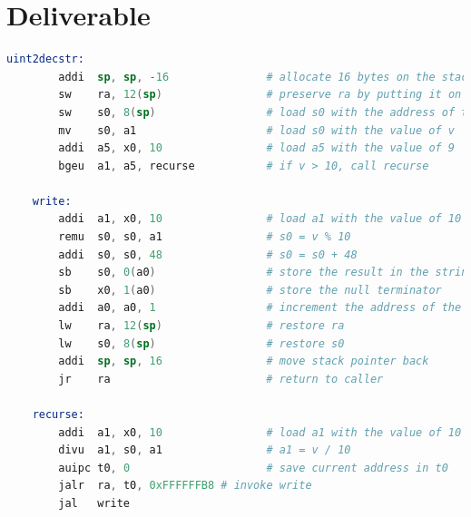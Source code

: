 \documentclass{article}
\begin{document}
\section{Deliverable}
\begin{lstlisting}[language=Assembler]
    uint2decstr:
        addi  sp, sp, -16               # allocate 16 bytes on the stack
        sw    ra, 12(sp)                # preserve ra by putting it on the stack
        sw    s0, 8(sp)                 # load s0 with the address of the string
        mv    s0, a1                    # load s0 with the value of v
        addi  a5, x0, 10                # load a5 with the value of 9
        bgeu  a1, a5, recurse           # if v > 10, call recurse

    write:
        addi  a1, x0, 10                # load a1 with the value of 10
        remu  s0, s0, a1                # s0 = v % 10
        addi  s0, s0, 48                # s0 = s0 + 48
        sb    s0, 0(a0)                 # store the result in the string
        sb    x0, 1(a0)                 # store the null terminator
        addi  a0, a0, 1                 # increment the address of the string
        lw    ra, 12(sp)                # restore ra
        lw    s0, 8(sp)                 # restore s0
        addi  sp, sp, 16                # move stack pointer back
        jr    ra                        # return to caller

    recurse:
        addi  a1, x0, 10                # load a1 with the value of 10
        divu  a1, s0, a1                # a1 = v / 10
        auipc t0, 0                     # save current address in t0
        jalr  ra, t0, 0xFFFFFFB8 # invoke write
        jal   write
\end{lstlisting}
\end{document}
